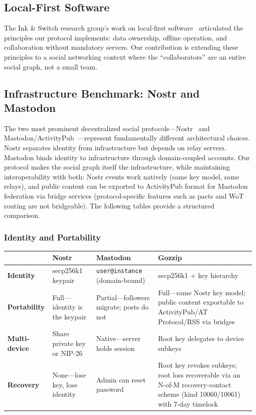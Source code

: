 \documentclass[11pt,a4paper]{article}
\begin{document}
\subsection{Local-First Software}

The Ink \& Switch research group's work on local-first software~\cite{localfirst} articulated the principles our protocol implements: data ownership, offline operation, and collaboration without mandatory servers. Our contribution is extending these principles to a social networking context where the ``collaborators'' are an entire social graph, not a small team.

\subsection{Infrastructure Benchmark: Nostr and Mastodon}

The two most prominent decentralized social protocols---Nostr~\cite{nostr} and Mastodon/Activity\-Pub~\cite{activitypub}---represent fundamentally different architectural choices. Nostr separates identity from infrastructure but depends on relay servers. Mastodon binds identity to infrastructure through domain-coupled accounts. Our protocol makes the social graph itself the infrastructure, while maintaining interoperability with both: Nostr events work natively (same key model, same relays), and public content can be exported to ActivityPub format for Mastodon federation via bridge services (protocol-specific features such as pacts and WoT routing are not bridgeable). The following tables provide a structured comparison.

\subsubsection*{Identity and Portability}

\begin{table}[h]
\centering
\small
\begin{tabularx}{\textwidth}{lXXX}
\toprule
 & \textbf{Nostr} & \textbf{Mastodon} & \textbf{Gozzip} \\
\midrule
\textbf{Identity} & secp256k1 keypair & \texttt{user@instance} (domain-bound) & secp256k1 + key hierarchy \\
\textbf{Portability} & Full---identity is the keypair & Partial---followers migrate; posts do not & Full---same Nostr key model; public content exportable to ActivityPub/AT Protocol/RSS via bridges \\
\textbf{Multi-device} & Share private key or NIP-26 & Native---server holds session & Root key delegates to device subkeys \\
\textbf{Recovery} & None---lose key, lose identity & Admin can reset password & Root key revokes subkeys; root loss recoverable via an N-of-M recovery-contact scheme (kind 10060/10061) with 7-day timelock \\
\bottomrule
\end{tabularx}
\end{table}
\end{document}
